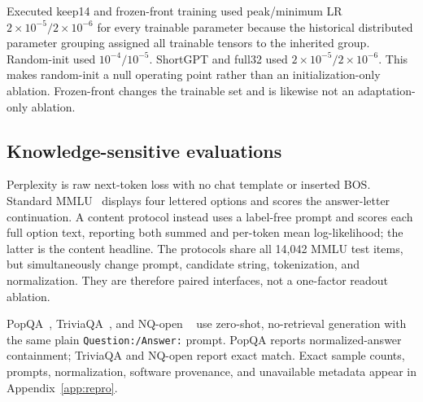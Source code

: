 Executed keep14 and frozen-front training used peak/minimum LR
$2\times10^{-5}/2\times10^{-6}$ for every trainable parameter because the
historical distributed parameter grouping assigned all trainable tensors to
the inherited group. Random-init used $10^{-4}/10^{-5}$. ShortGPT and full32
used $2\times10^{-5}/2\times10^{-6}$. This makes random-init a null operating
point rather than an initialization-only ablation. Frozen-front changes the
trainable set and is likewise not an adaptation-only ablation.

\subsection{Knowledge-sensitive evaluations}
Perplexity is raw next-token loss with no chat template or inserted BOS.
Standard MMLU~\citep{hendrycks2021mmlu} displays four lettered options and
scores the answer-letter continuation. A content protocol instead uses a
label-free prompt and scores each full option text, reporting both summed and
per-token mean log-likelihood; the latter is the content headline. The
protocols share all 14,042 MMLU test items, but simultaneously change prompt,
candidate string, tokenization, and normalization. They are therefore paired
interfaces, not a one-factor readout ablation.

PopQA~\citep{mallen2023popqa}, TriviaQA~\citep{joshi2017triviaqa}, and NQ-open
~\citep{kwiatkowski2019natural} use zero-shot, no-retrieval generation with the
same plain \texttt{Question:/Answer:} prompt. PopQA reports normalized-answer
containment; TriviaQA and NQ-open report exact match. Exact sample counts,
prompts, normalization, software provenance, and unavailable metadata appear
in Appendix~\ref{app:repro}.
